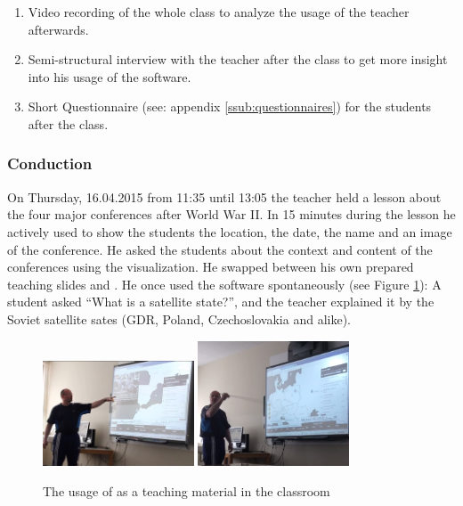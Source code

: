 \begin{enumerate}
  \item Video recording of the whole class to analyze the usage of the teacher afterwards.
  \item Semi-structural interview with the teacher after the class to get more insight into his usage of the software.
  \item Short Questionnaire (see: appendix \ref{ssub:questionnaires}) for the students after the class.
\end{enumerate}


\subsubsection{Conduction} %
\label{sub:conduction-1}
On Thursday, 16.04.2015 from 11:35 until 13:05 the teacher held a lesson about the four major conferences after World War II. In 15 minutes during the lesson he actively used \HG to show the students the location, the date, the name and an image of the conference. He asked the students about the context and content of the conferences using the visualization. He swapped between his own prepared teaching slides and \HG. He once used the software spontaneously (see Figure \ref{fig:teacher}): A student asked ``What is a satellite state?'', and the teacher explained it by the Soviet satellite sates (GDR, Poland, Czechoslovakia and alike).

\begin{figure}[ht]
  \begin{center}
    \includegraphics[width=0.4\textwidth]{graphics/teacher-2.png}
    \includegraphics[width=0.4\textwidth]{graphics/teacher-1.png}
  \end{center}
  \caption{The usage of \HG as a teaching material in the classroom}
  \label{fig:teacher}
\end{figure}

